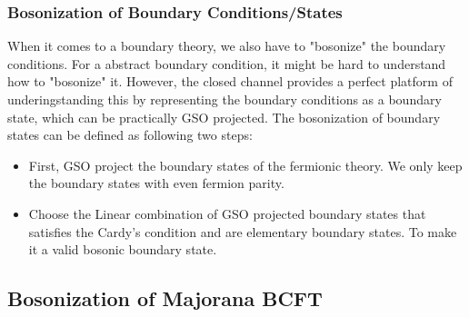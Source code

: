 %
%
%
%
%

\subsubsection{Bosonization of Boundary Conditions/States}

When it comes to a boundary theory, we also have to "bosonize" the boundary conditions. For a abstract boundary condition, it might be hard to understand how to "bosonize" it. 
However, the closed channel provides a perfect platform of underingstanding this by representing the boundary conditions as a boundary state, which can be practically GSO projected. The bosonization of boundary states can be defined as following two steps:
\begin{itemize}
  \item First, GSO project the boundary states of the fermionic theory. We only keep the boundary states with even fermion parity.
  \item Choose the Linear combination of GSO projected boundary states that satisfies the Cardy's condition and are elementary boundary states. To make it a valid bosonic boundary state.
\end{itemize}


\subsection{Bosonization of Majorana BCFT}

